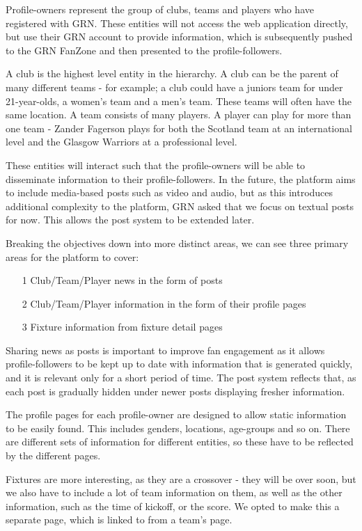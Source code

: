 \documentclass{l3proj}
\begin{document}
Profile-owners represent the group of clubs, teams and players who have registered with
 GRN. These entities will not access the web application directly, but use their GRN account
 to provide information, which is subsequently pushed to the GRN FanZone and then presented
 to the profile-followers.
 
A club is the highest level entity in the hierarchy. A club can be the parent of many different
 teams - for example; a club could have a juniors team for under 21-year-olds, a women's team and
 a men's team. These teams will often have the same location. A team consists of many players. A
 player can play for more than one team - Zander Fagerson plays for both the Scotland
 team at an international level and the Glasgow Warriors at a professional level.
 
These entities will interact such that the profile-owners will be able to disseminate
 information to their profile-followers. In the future, the platform aims to include 
 media-based posts such as video and audio, but as this introduces additional complexity
 to the platform, GRN asked that we focus on textual posts for now. This allows the post system
 to be extended later.

 
Breaking the objectives down into more distinct areas, we can see three primary areas for
 the platform to cover:

\begin{itemize}
\item[1] Club/Team/Player news in the form of posts
\item[2] Club/Team/Player information in the form of their profile pages
\item[3] Fixture information from fixture detail pages 
\end{itemize}

Sharing news as posts is important to improve fan engagement as it allows
 profile-followers to be kept up to date with information that is generated quickly,
 and it is relevant only for a short period of time. The post system reflects 
 that, as each post is gradually hidden under newer posts displaying fresher 
 information.

The profile pages for each profile-owner are designed to allow static 
 information to be easily found. This includes genders, locations, age-groups and 
 so on. There are different sets of information for different entities, so these
 have to be reflected by the different pages.
 
Fixtures are more interesting, as they are a crossover - they will be over soon, 
 but we also have to include a lot of team information on them, as well as the
 other information, such as the time of kickoff, or the score. We opted to make 
 this a separate page, which is linked to from a team's page.
 
\end{document}
